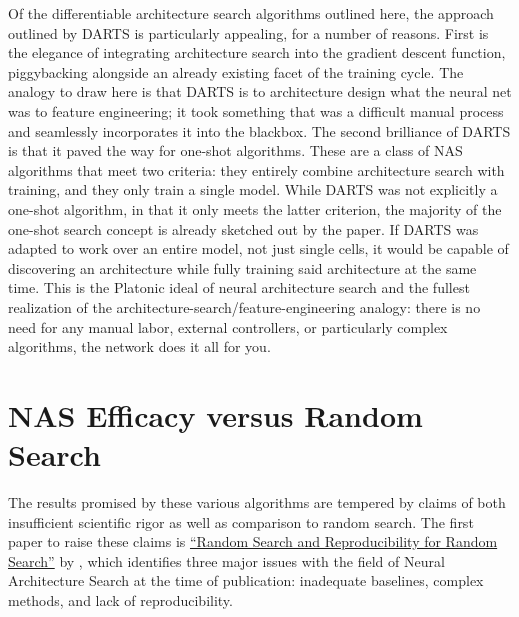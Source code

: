 Of the differentiable architecture search algorithms outlined here, the approach outlined by DARTS is
particularly appealing, for a number of reasons. First is the elegance of integrating architecture search into the
gradient descent function, piggybacking alongside an already existing facet of the training cycle. The analogy to
draw here is that DARTS is to architecture design what the neural net was to feature engineering; it took something that was
a difficult manual process and seamlessly incorporates it into the blackbox. The second brilliance of DARTS is that it
paved the way for one-shot algorithms. These are a class of NAS algorithms that meet two criteria: they entirely combine architecture
search with training, and they only train a single model. While DARTS was not explicitly a one-shot algorithm, in that
it only meets the latter criterion, the majority of the one-shot search concept is already sketched out by the paper.
If DARTS was adapted to work over an entire model, not just single cells, it would be capable of discovering an architecture
while fully training said architecture at the same time. This is the Platonic ideal of neural architecture search
and the fullest realization of the architecture-search/feature-engineering analogy: there is no need for
any manual labor, external controllers, or particularly complex algorithms, the network does it all for you.

\section{NAS Efficacy versus Random Search} \label{sect:random_search}
The results promised by these various algorithms are tempered by claims of both insufficient
scientific rigor as well as comparison to random search. The first paper to raise these claims is \hyperlink{cite.li2019}{``Random Search and
Reproducibility for Random Search''} by \citeauthor{li2019}, which identifies three major issues with the
field of Neural Architecture Search at the time of publication: inadequate baselines, complex methods, and lack of
reproducibility.

